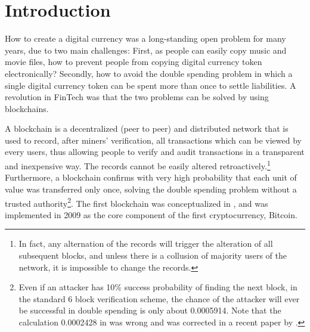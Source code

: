 \documentclass[11pt]{article}%
\numberwithin{equation}{section}
\theoremstyle{plain}
\begin{document}



%


\section{Introduction}


How to create a digital currency was a long-standing open problem for many years, due to two main challenges: First, as people can easily copy music and movie files, how to prevent people from copying digital currency token electronically? Secondly, how to avoid the double spending problem in which a single digital currency token can be spent more than once to settle liabilities. A revolution in FinTech was that the two problems can be solved by using blockchains.

A blockchain is a decentralized (peer to peer) and distributed network that is used to record, after miners' verification, all transactions which can be viewed by every users, thus allowing people to verify and audit transactions in a transparent and inexpensive way. The records cannot be easily altered retroactively.\footnote{In fact, any alternation of the records will trigger the alteration of all subsequent blocks, and unless there is a collusion of majority users of the network, it is impossible to change the records.} Furthermore, a blockchain confirms with very high probability that each unit of value was transferred only once, solving the  double spending problem without a trusted authority\footnote{Even if an attacker has 10\% success probability of finding the next block, in the standard 6 block verification scheme, the chance of the attacker will ever be successful in double spending is only about 0.0005914. Note that the calculation 0.0002428 in \cite{nakamoto_bitcoin:_2008} was wrong and was corrected in a recent paper by \cite{Grunspan_2018}.}. The first blockchain was conceptualized in \cite{nakamoto_bitcoin:_2008}, and was implemented in 2009 as the core component of the first cryptocurrency, Bitcoin.
\end{document}
